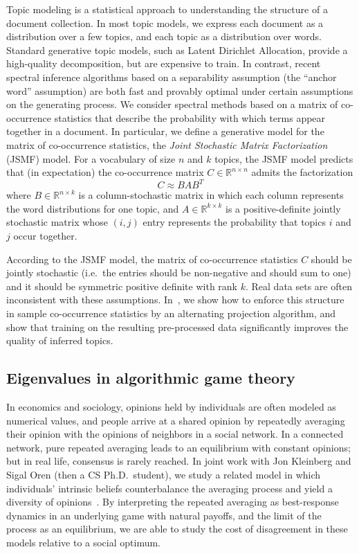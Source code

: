 \documentclass{amsart}
\newcommand{\bbR}{\mathbb{R}}
\begin{document}
Topic modeling is a statistical approach to understanding the
structure of a document collection.  In most topic models,
we express each document as a distribution over a few topics,
and each topic as a distribution over words.
Standard generative topic models, such as Latent Dirichlet Allocation,
provide a high-quality decomposition, but are expensive to train.
In contrast, recent spectral inference algorithms based on
a separability assumption (the ``anchor
word'' assumption) are both fast and provably optimal under certain
assumptions on the generating process. We consider spectral methods
based on a matrix of co-occurrence statistics that
describe the probability with which terms appear together in a document.
In particular, we define a generative model for the matrix of
co-occurrence statistics, the {\em Joint Stochastic Matrix
Factorization} (JSMF) model.  For a vocabulary of size $n$ and $k$
topics, the JSMF model predicts that (in expectation) the
co-occurrence matrix $C\in \bbR^{n \times n}$ admits the
factorization
\[
  C \approx B A B^T
\]
where $B \in \bbR^{n \times k}$ is
a column-stochastic matrix in which each column represents the word
distributions for one topic, and $A \in \bbR^{k \times k}$ is a
positive-definite jointly stochastic matrix whose $(i,j)$ entry
represents the probability that topics $i$ and $j$ occur together.

According to the JSMF model, the matrix of co-occurrence statistics $C$
should be jointly stochastic (i.e.~the entries should be non-negative
and should sum to one) and it should be symmetric positive definite with
rank $k$.  Real data sets are often inconsistent with these assumptions.
In~\cite{2015-nips}, we show how to enforce this structure in
sample co-occurrence statistics by an alternating projection algorithm,
and show that training on the resulting pre-processed data significantly
improves the quality of inferred topics.

\subsection*{Eigenvalues in algorithmic game theory}

In economics and sociology, opinions held by individuals are often
modeled as numerical values, and people arrive at a shared opinion by
repeatedly averaging their opinion with the opinions of neighbors in a
social network.  In a connected network, pure repeated averaging leads
to an equilibrium with constant opinions; but in
real life, consensus is rarely reached. In joint work with Jon
Kleinberg and Sigal Oren (then a CS Ph.D.~student),
we study a related model in which individuals’ intrinsic beliefs
counterbalance the averaging process and yield a diversity of opinions~\cite{2011-focs,2015-geb}.
By interpreting the repeated averaging as best-response dynamics in an
underlying game with natural payoffs, and the limit of the process as an
equilibrium, we are able to study the cost of disagreement in these
models relative to a social optimum.
\end{document}
